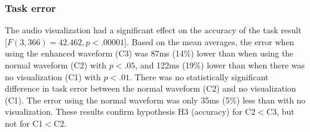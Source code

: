 \subsubsection{Task error}
The audio visualization had a significant effect on the accuracy of the task result [$F(3,366)=42.462, p<.00001$].
Based on the mean averages, the error when using the enhanced waveform (C3) was 87ms (14\%) lower than when using the
normal waveform (C2) with $p<.05$, and 122ms (19\%) lower than when there was no visualization (C1) with $p<.01$. There
was no statistically significant difference in task error between the normal waveform (C2) and no visualization (C1).
The error using the normal waveform was only 35ms (5\%) less than with no visualization.  These results confirm
hypothesis H3 (accuracy) for C2$<$C3, but not for C1$<$C2.




